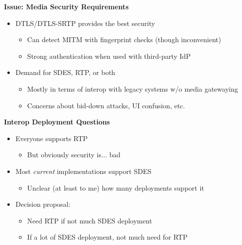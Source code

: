 \documentclass[helvetica]{seminar}
\newcommand{\heading}[1]{%
  \begin{center} 
    \large\bf 
    #1 
  \end{center} 
  \vspace{.4 in}}
\begin{document}
\begin{slide}
\heading{Issue: Media Security Requirements}

\begin{itemize}
\item DTLS/DTLS-SRTP provides the best security
  \begin{itemize}
  \item Can detect MITM with fingerprint checks (though inconvenient)
  \item Strong authentication when used with third-party IdP
  \end{itemize}

\item Demand for SDES, RTP, or both
  \begin{itemize}
  \item Mostly in terms of interop with legacy systems w/o media gatewaying
  \item Concerns about bid-down attacks, UI confusion, etc.
  \end{itemize}
\end{itemize}
\end{slide}


\begin{slide}
\heading{Interop Deployment Questions}

\begin{itemize}
\item Everyone supports RTP
  \begin{itemize}
  \item But obviously security is... bad
  \end{itemize}

\item Most \emph{current} implementations support SDES
  \begin{itemize}
  \item Unclear (at least to me) how many deployments support it
  \end{itemize}

\item Decision proposal:
  \begin{itemize}
  \item Need RTP if not much SDES deployment
  \item If a lot of SDES deployment, not much need for RTP
  \end{itemize}


\end{itemize}

\end{slide}
\end{document}

